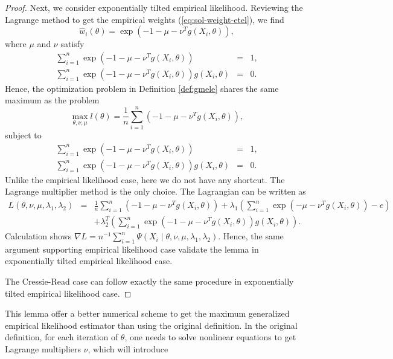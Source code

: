 \begin{proof}
Next, we consider exponentially tilted empirical likelihood. Reviewing
the Lagrange method to get the empirical weights (\ref{eq:sol-weight-etel}),
we find 
\[
\hat{w}_{i}\left(\theta\right)=\exp\left(-1-\mu-\nu^{T}g\left(X_{i},\theta\right)\right),
\]
where $\mu$ and $\nu$ satisfy 
\begin{eqnarray*}
\sum_{i=1}^{n}\exp\left(-1-\mu-\nu^{T}g\left(X_{i},\theta\right)\right) & = & 1,\\
\sum_{i=1}^{n}\exp\left(-1-\mu-\nu^{T}g\left(X_{i},\theta\right)\right)g\left(X_{i},\theta\right) & = & 0.
\end{eqnarray*}
 Hence, the optimization problem in Definition \ref{def:gmele} shares
the same maximum as the problem 
\[
\max_{\theta,\nu,\mu}l\left(\theta\right)=\frac{1}{n}\sum_{i=1}^{n}\left(-1-\mu-\nu^{T}g\left(X_{i},\theta\right)\right),
\]
subject to 
\begin{eqnarray*}
\sum_{i=1}^{n}\exp\left(-1-\mu-\nu^{T}g\left(X_{i},\theta\right)\right) & = & 1,\\
\sum_{i=1}^{n}\exp\left(-1-\mu-\nu^{T}g\left(X_{i},\theta\right)\right)g\left(X_{i},\theta\right) & = & 0.
\end{eqnarray*}
Unlike the empirical likelihood case, here we do not have any shortcut.
The Lagrange multiplier method is the only choice. The Lagrangian
can be written as 
\begin{eqnarray*}
L\left(\theta,\nu,\mu,\lambda_{1},\lambda_{2}\right) & = & \frac{1}{n}\sum_{i=1}^{n}\left(-1-\mu-\nu^{T}g\left(X_{i},\theta\right)\right)+\lambda_{1}\left(\sum_{i=1}^{n}\exp\left(-\mu-\nu^{T}g\left(X_{i},\theta\right)\right)-e\right)\\
 &  & +\lambda_{2}^{T}\left(\sum_{i=1}^{n}\exp\left(-1-\mu-\nu^{T}g\left(X_{i},\theta\right)\right)g\left(X_{i},\theta\right)\right).
\end{eqnarray*}
Calculation shows $\nabla L=n^{-1}\sum_{i=1}^{n}\Psi\left(X_{i}\mid\theta,\nu,\mu,\lambda_{1},\lambda_{2}\right)$.
Hence, the same argument supporting empirical likelihood case validate
the lemma in exponentially tilted empirical likelihood case.

The Cressie-Read case can follow exactly the same procedure in exponentially
tilted empirical likelihood case.
\end{proof}
This lemma offer a better numerical scheme to get the maximum generalized
empirical likelihood estimator than using the original definition. In the original
definition, for each iteration of $\theta$, one needs to solve nonlinear
equations to get Lagrange multipliers $\nu$, which will introduce
